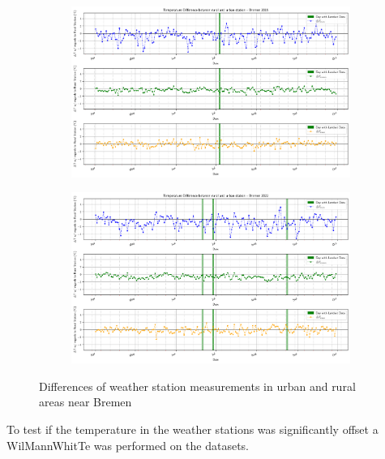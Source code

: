 \documentclass[12pt,a4paper, english]{article}
\begin{document}
%
    \begin{figure}[!p]
     \centering
       \begin{subfigure}[b]{\textwidth}
        \includegraphics[width=\textwidth]{img/BremenDifferences2015.png}
        \label{fig:diff2015Bre}
       \end{subfigure}
       \begin{subfigure}[b]{\textwidth}
        \includegraphics[width=\textwidth]{img/BremenDifferences2022.png}
        \label{fig:diff20222Bre}
       \end{subfigure}
         \caption{Differences of weather station measurements in urban and rural areas near Bremen}\label{fig:diffBre}
   \end{figure}
   To test if the temperature in the weather stations was significantly offset a \gls{WilMannWhitTe} was performed on the datasets.
\end{document}
